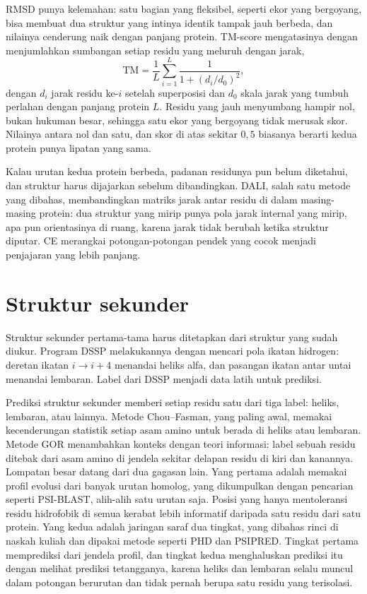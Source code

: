 RMSD punya kelemahan: satu bagian yang fleksibel, seperti ekor yang bergoyang, bisa membuat dua struktur yang intinya identik
tampak jauh berbeda, dan nilainya cenderung naik dengan panjang protein. TM-score mengatasinya dengan menjumlahkan sumbangan
setiap residu yang meluruh dengan jarak,
\begin{equation}
\mathrm{TM}=\frac1L\sum_{i=1}^{L}\frac1{1+(d_i/d_0)^2},
\end{equation}
dengan $d_i$ jarak residu ke-$i$ setelah superposisi dan $d_0$ skala jarak yang tumbuh perlahan dengan panjang protein $L$.
Residu yang jauh menyumbang hampir nol, bukan hukuman besar, sehingga satu ekor yang bergoyang tidak merusak skor.
Nilainya antara nol dan satu, dan skor di atas sekitar $0{,}5$ biasanya berarti kedua protein punya lipatan yang sama.

Kalau urutan kedua protein berbeda, padanan residunya pun belum diketahui, dan struktur harus dijajarkan sebelum
dibandingkan. DALI, salah satu metode yang dibahas, membandingkan matriks jarak antar residu di dalam masing-masing protein:
dua struktur yang mirip punya pola jarak internal yang mirip, apa pun orientasinya di ruang, karena jarak tidak berubah
ketika struktur diputar. CE merangkai potongan-potongan pendek yang cocok menjadi penjajaran yang lebih panjang.

\section{Struktur sekunder}

Struktur sekunder pertama-tama harus ditetapkan dari struktur yang sudah diukur. Program DSSP melakukannya dengan mencari pola
ikatan hidrogen: deretan ikatan $i\to i+4$ menandai heliks alfa, dan pasangan ikatan antar untai menandai lembaran. Label
dari DSSP menjadi data latih untuk prediksi.

Prediksi struktur sekunder memberi setiap residu satu dari tiga label: heliks, lembaran, atau lainnya. Metode Chou--Fasman,
yang paling awal, memakai kecenderungan statistik setiap asam amino untuk berada di heliks atau lembaran. Metode GOR menambahkan
konteks dengan teori informasi: label sebuah residu ditebak dari asam amino di jendela sekitar delapan residu di kiri dan
kanannya. Lompatan besar datang dari dua gagasan lain. Yang pertama adalah memakai profil evolusi dari banyak urutan homolog,
yang dikumpulkan dengan pencarian seperti PSI-BLAST, alih-alih satu urutan saja. Posisi yang hanya mentoleransi residu
hidrofobik di semua kerabat lebih informatif daripada satu residu dari satu protein. Yang kedua adalah jaringan saraf dua
tingkat, yang dibahas rinci di naskah kuliah dan dipakai metode seperti PHD dan PSIPRED. Tingkat pertama memprediksi dari jendela
profil, dan tingkat kedua menghaluskan prediksi itu dengan melihat prediksi tetangganya, karena heliks dan lembaran selalu
muncul dalam potongan berurutan dan tidak pernah berupa satu residu yang terisolasi.


